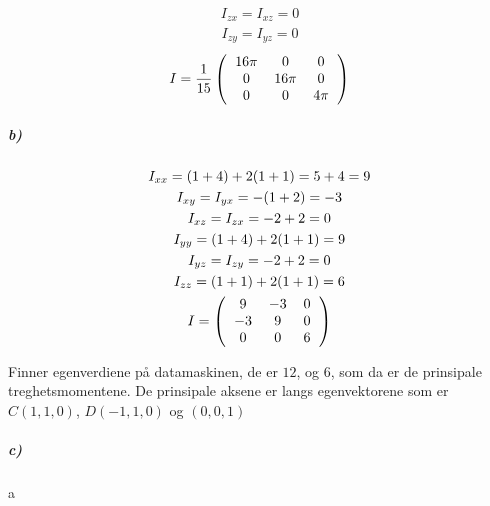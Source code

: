 \documentclass[11pt, A4paper,norsk]{article}
\begin{document}
				\begin{gather*}
I_{z x} = I_{x z} = 0
				\end{gather*}
				\begin{gather*}
I_{z y} = I_{y z} = 0
				\end{gather*}
				\begin{gather*}
I = \frac{1}{15} \left(
\begin{tabular} { ccc }
$16 \pi$ & $0$ & $0$ \\
$0$ & $16 \pi$ & $0$ \\
$0$ & $0$ & $4 \pi$
\end{tabular}
\right)
				\end{gather*}







			\subparagraph{b)}
				\begin{gather*}
I_{x x} = (1 + 4) + 2 (1 + 1) = 5 + 4 = 9 \\
I_{x y} = I_{y x} = - (1 + 2) = - 3 \\
I_{x z} = I_{z x} = - 2 + 2 = 0 \\
I_{y y} = (1 + 4) + 2 (1 + 1) = 9 \\
I_{y z} = I_{z y} = - 2 + 2 = 0 \\
I_{z z} = (1 + 1) + 2 (1 + 1) = 6 \\
I = \left(
\begin{tabular} { ccc }
$9$ & $- 3$ & $0$ \\
$- 3$ & $9$ & $0$ \\
$0$ & $0$ & $6$
\end{tabular}
\right)
				\end{gather*}
				\begin{flushleft}
Finner egenverdiene på datamaskinen, de er $12$, og $6$, som da er de prinsipale treghetsmomentene. De prinsipale aksene er langs egenvektorene som er $C (1, 1, 0)$, $D (- 1, 1, 0)$ og $(0, 0, 1)$
				\end{flushleft}











			\subparagraph{c)}
				\begin{flushleft}
a
				\end{flushleft}
\end{document}
